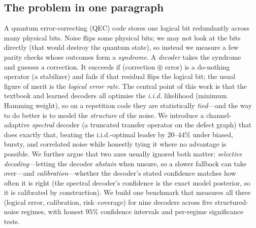 \documentclass[reprint,aps,prxquantum,amsmath,amssymb,floatfix,nofootinbib,longbibliography]{revtex4-2}
\theoremstyle{definition}
\theoremstyle{remark}
\theoremstyle{plain}
\begin{document}
\subsection{The problem in one paragraph}
\label{sec:si_problem}
A quantum error-correcting (QEC) code stores one logical bit redundantly across many physical bits. Noise flips some physical bits; we may not look at the bits directly (that would destroy the quantum state), so instead we measure a few parity checks whose outcomes form a \emph{syndrome}. A \emph{decoder} takes the syndrome and guesses a correction. It succeeds if (correction $\oplus$ error) is a do-nothing operator (a stabilizer) and fails if that residual flips the logical bit; the usual figure of merit is the \emph{logical error rate}. The central point of this work is that the textbook and learned decoders all optimise the \emph{i.i.d.} likelihood (minimum Hamming weight), so on a repetition code they are statistically \emph{tied}---and the way to do better is to model the \emph{structure} of the noise. We introduce a channel-adaptive \emph{spectral} decoder (a truncated transfer operator on the defect graph) that does exactly that, beating the i.i.d.-optimal leader by $20$--$44\%$ under biased, bursty, and correlated noise while honestly tying it where no advantage is possible. We further argue that two axes usually ignored both matter: \emph{selective decoding}---letting the decoder \emph{abstain} when unsure, so a slower fallback can take over---and \emph{calibration}---whether the decoder's stated confidence matches how often it is right (the spectral decoder's confidence is the exact model posterior, so it is calibrated by construction). We build one benchmark that measures all three (logical error, calibration, risk--coverage) for nine decoders across five structured-noise regimes, with honest $95\%$ confidence intervals and per-regime significance tests.
\end{document}

